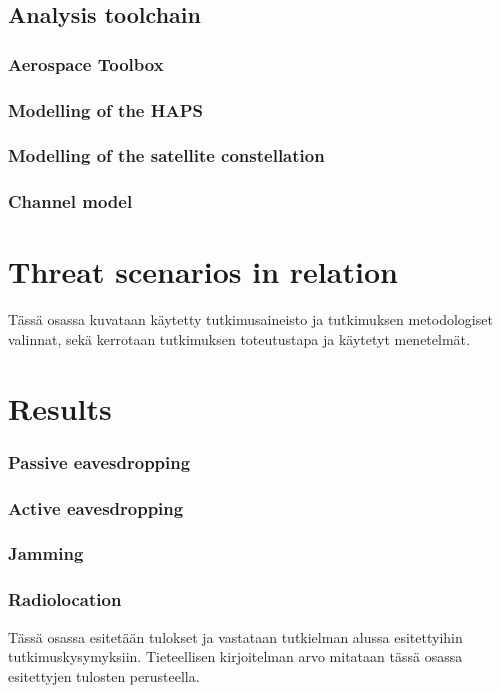 \documentclass[english, 12pt, a4paper, elec, utf8, a-1b, online]{aaltothesis}
\begin{document}
\subsection{Analysis toolchain}
\subsubsection{Aerospace Toolbox}
\subsubsection{Modelling of the HAPS}
\subsubsection{Modelling of the satellite constellation}
\subsubsection{Channel model}

\section{Threat scenarios in relation}
T\"ass\"a osassa kuvataan k\"aytetty tutkimusaineisto ja
tutkimuksen metodologiset valinnat, sek\"a
kerrotaan tutkimuksen toteutustapa ja k\"aytetyt menetelm\"at.


\clearpage

\section{Results}
\subsubsection{Passive eavesdropping}
\subsubsection{Active eavesdropping}
\subsubsection{Jamming}
\subsubsection{Radiolocation}


T\"ass\"a osassa esitet\"a\"an tulokset ja vastataan tutkielman alussa
esitettyihin tutkimuskysymyksiin. Tieteellisen kirjoitelman
arvo mitataan t\"ass\"a osassa esitettyjen tulosten perusteella. 
\end{document}
